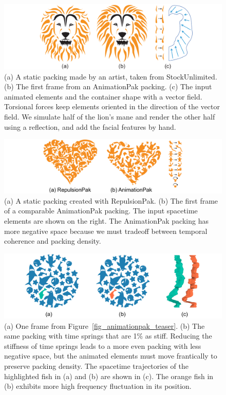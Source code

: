 \begin{figure}
  \centering
  \includegraphics[width=1.0\textwidth]{figures/animationpak/lion_comparison.pdf}
  \caption[A packing of lion's mane]
  {
  \label{fig_animationpak_lion}
    (a) A static packing made by an artist, taken from StockUnlimited. 
	(b) The first frame from an AnimationPak packing. 
	(c) The input animated elements and the container shape with a vector field.
	Torsional forces keep elements oriented in the direction of the
	vector field.  We simulate half of the lion's mane and render the other
	half using a reflection, and add the facial features by hand.
  }  
\end{figure}
\begin{figure}
  \centering
  \includegraphics[width=1.0\textwidth]{figures/animationpak/repulsionpak_vs_animationpak.pdf}
  \caption[A comparison between RepulsionPak and AnimationPak]
  {
  \label{fig_animationpak_repulsionpak_vs_animationpak}
  	(a) A static packing created with RepulsionPak.
	(b) The first frame of a comparable AnimationPak packing.
    The input spacetime elements are shown on the right.
	The AnimationPak packing has more negative space because
	we must tradeoff between temporal coherence and packing density.
  }  
\end{figure}


\begin{figure}[t]
\centering
\includegraphics[width=1.0\textwidth]{figures/animationpak/teaser_weak_t_springs.pdf} 
\caption[The effect of adjusting time spring stiffness]
{\label{fig_animationpak_teaser_weak_t_springs} 
(a) One frame from Figure~\ref{fig_animationpak_teaser}.
(b) The same packing with time springs that are 1\% as stiff.
Reducing the stiffness of time springs leads to a more even packing with
less negative space, but the animated elements must move frantically to
preserve packing density.  
The spacetime trajectories of the highlighted
fish in (a) and (b) are shown in (c).  The orange fish in (b) exhibits more
high frequency fluctuation in its position.
}
\end{figure}

